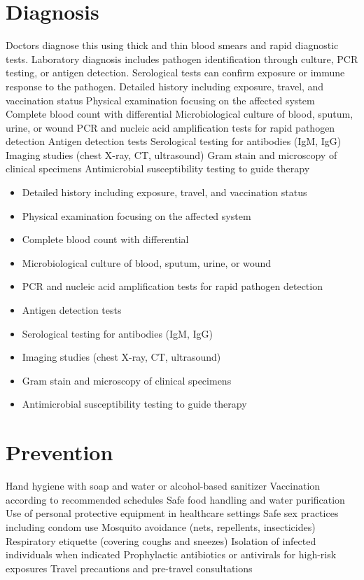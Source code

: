 \section{Diagnosis}
Doctors diagnose this using thick and thin blood smears and rapid diagnostic tests. Laboratory diagnosis includes pathogen identification through culture, PCR testing, or antigen detection. Serological tests can confirm exposure or immune response to the pathogen. Detailed history including exposure, travel, and vaccination status Physical examination focusing on the affected system Complete blood count with differential Microbiological culture of blood, sputum, urine, or wound PCR and nucleic acid amplification tests for rapid pathogen detection Antigen detection tests Serological testing for antibodies (IgM, IgG) Imaging studies (chest X-ray, CT, ultrasound) Gram stain and microscopy of clinical specimens Antimicrobial susceptibility testing to guide therapy

\begin{itemize}[noitemsep]
  \item Detailed history including exposure, travel, and vaccination status
  \item Physical examination focusing on the affected system
  \item Complete blood count with differential
  \item Microbiological culture of blood, sputum, urine, or wound
  \item PCR and nucleic acid amplification tests for rapid pathogen detection
  \item Antigen detection tests
  \item Serological testing for antibodies (IgM, IgG)
  \item Imaging studies (chest X-ray, CT, ultrasound)
  \item Gram stain and microscopy of clinical specimens
  \item Antimicrobial susceptibility testing to guide therapy
\end{itemize}
\section{Prevention}
Hand hygiene with soap and water or alcohol-based sanitizer Vaccination according to recommended schedules Safe food handling and water purification Use of personal protective equipment in healthcare settings Safe sex practices including condom use Mosquito avoidance (nets, repellents, insecticides) Respiratory etiquette (covering coughs and sneezes) Isolation of infected individuals when indicated Prophylactic antibiotics or antivirals for high-risk exposures Travel precautions and pre-travel consultations

